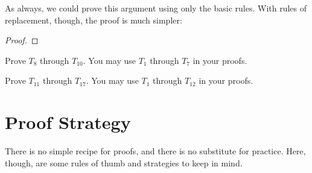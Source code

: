 As always, we could prove this argument using only the basic rules. With rules of replacement, though, the proof is much simpler:

 

\begin{proof}
\end{proof}









 

\practiceproblems
\noindent\problempart
Prove $T_{8}$ through $T_{10}$. You may use $T_{1}$ through $T_7$ in your proofs.

\noindent\problempart
Prove $T_{11}$ through $T_{17}$. You may use $T_{1}$ through $T_{12}$ in your proofs.






\section{Proof Strategy}
\setlength{\parindent}{1em}
There is no simple recipe for proofs, and there is no substitute for practice. Here, though, are some rules of thumb and strategies to keep in mind.

